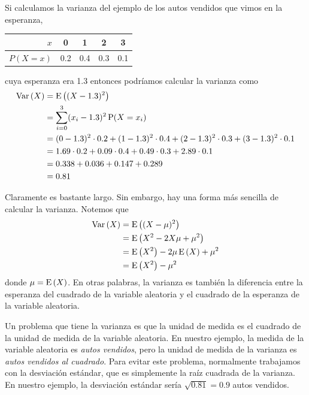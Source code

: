 Si calculamos la varianza del ejemplo de los autos vendidos que vimos en la esperanza, 
\begin{center}
  \begin{tabular}{rSSSS}
    \(x\) & 0 & 1 & 2 & 3 \\
    \midrule
    \(P(X=x)\) & 0.2 & 0.4 & 0.3 & 0.1 \\
  \end{tabular}
\end{center}
cuya esperanza era \num{1,3} entonces podríamos calcular la varianza como
\begin{align*}
  \operatorname{Var}\left(X\right) &= \operatorname{E}\left((X-\num{1,3})^2\right)\\
  &= \sum_{i=0}^{3} (x_i - \num{1,3})^2 \operatorname{P}(X=x_i)\\
  &= (0 - \num{1,3})^2 \cdot \num{0,2} + (1 - \num{1,3})^2 \cdot \num{0,4} + (2 - \num{1,3})^2 \cdot \num{0,3} + (3 - \num{1,3})^2 \cdot \num{0,1}\\
  &= \num{1,69} \cdot \num{0,2} + \num{0,09} \cdot \num{0,4} + \num{0,49} \cdot \num{0,3} + \num{2,89} \cdot \num{0,1}\\
  &= \num{0,338} + \num{0,036} + \num{0,147} + \num{0,289}\\
  &= \num{0,81}
\end{align*}

Claramente es bastante largo. Sin embargo, hay una forma más sencilla de calcular la varianza. Notemos que
\begin{align*}
  \operatorname{Var}\left(X\right) &= \operatorname{E}\left((X-\mu)^2\right)\\
  &= \operatorname{E}\left(X^2 - 2X\mu + \mu^2\right)\\
  &= \operatorname{E}\left(X^2\right) - 2\mu\operatorname{E}\left(X\right) + \mu^2\\
  &= \operatorname{E}\left(X^2\right) - \mu^2
\end{align*}
donde \(\mu=\operatorname{E}\left(X\right)\). En otras palabras, la varianza es también la diferencia entre la esperanza del cuadrado de la variable aleatoria y el cuadrado de la esperanza de la variable aleatoria.

Un problema que tiene la varianza es que la unidad de medida es el cuadrado de la unidad de medida de la variable aleatoria. En nuestro ejemplo, la medida de la variable aleatoria es \emph{autos vendidos}, pero la unidad de medida de la varianza es \emph{autos vendidos al cuadrado}. Para evitar este problema, normalmente trabajamos con la desviación estándar, que es simplemente la raíz cuadrada de la varianza. En nuestro ejemplo, la desviación estándar sería \(\sqrt{\num{0,81}} = \num{0,9}\) autos vendidos.

